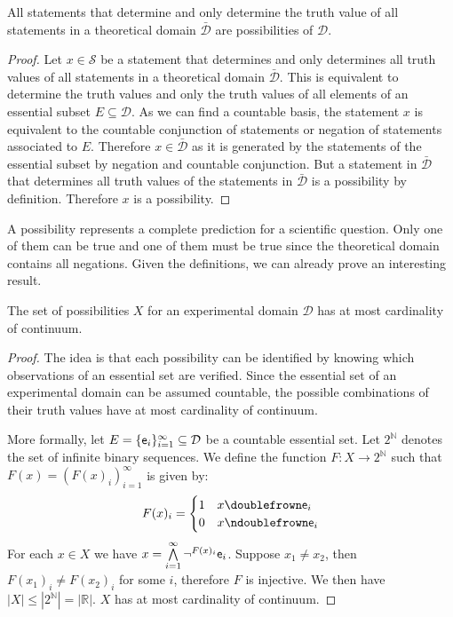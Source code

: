 \documentclass[11pt,letterpaper,fleqn]{memoir} %
\begin{document}
\begin{mathSection}
\begin{prop}
	All statements that determine and only determine the truth value of all statements in a theoretical domain $\bar{\mathcal{D}}$ are possibilities of $\mathcal{D}$.
\end{prop}

\begin{proof}
	Let $x \in \mathcal{S}$ be a statement that determines and only determines all truth values of all statements in a theoretical domain $\bar{\mathcal{D}}$. This is equivalent to determine the truth values and only the truth values of all elements of an essential subset $E \subseteq \mathcal{D}$. As we can find a countable basis, the statement $x$ is equivalent to the countable conjunction of statements or negation of statements associated to $E$. Therefore $x \in \bar{\mathcal{D}}$ as it is generated by the statements of the essential subset by negation and countable conjunction. But a statement in $\bar{\mathcal{D}}$ that determines all truth values of the statements in $\bar{\mathcal{D}}$ is a possibility by definition. Therefore $x$ is a possibility.
\end{proof}
\end{mathSection}

A possibility represents a complete prediction for a scientific question. Only one of them can be true and one of them must be true since the theoretical domain contains all negations. Given the definitions, we can already prove an interesting result.

\begin{mathSection}
	\begin{prop}
		The set of possibilities $X$ for an experimental domain $\mathcal{D}$ has at most cardinality of continuum.
	\end{prop}
	
	\begin{proof}
		The idea is that each possibility can be identified by knowing which observations of an essential set are verified. Since the essential set of an experimental domain can be assumed countable, the possible combinations of their truth values have at most cardinality of continuum.
		
		More formally, let $E = \{\obs[e]_i\}_{i=1}^{\infty} \subseteq \mathcal{D}$ be a countable essential set. Let $2^{\mathbb{N}}$ denotes the set of infinite binary sequences. We define the function $F:X\to2^{\mathbb{N}}$ such that $F(x) = (F(x)_i)_{i=1}^{\infty}$ is given by: 
		$$
		F(x)_i = 
		\begin{cases}
		1 & x \comp \obs[e]_i \\
		0 & x \ncomp \obs[e]_i
		\end{cases}
		$$
		For each $x \in X$ we have $x = \bigAND\limits_{i=1}^{\infty} \NOT^{F(x)_i} \obs[e]_i$. Suppose $x_1 \neq x_2$, then $F(x_1)_i \neq F(x_2)_i$ for some $i$, therefore $F$ is injective. We then have $|X| \leq |2^{\mathbb{N}}|=|\mathbb{R}|$. $X$ has at most cardinality of continuum.
	\end{proof}
\end{mathSection}
\end{document}
